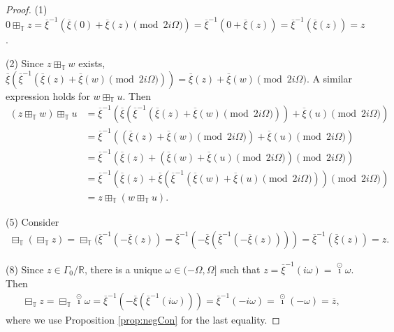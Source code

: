 \documentclass[reqno]{amsart}
\begin{document}
\begin{proof}
(1) $0 \boxplus_{\mathbb{T}} z = \overline{\xi}^{-1}(\overline{\xi}(0) + \overline{\xi}(z) \pmod {2 i \Omega} ) 
= \overline{\xi}^{-1}( 0 + \overline{\xi}(z)) =\overline{\xi}^{-1}( \overline{\xi}(z)) = z$.

(2) Since $z \boxplus_{\mathbb{T}} w$ exists,
$\overline{\xi}(\overline{\xi}^{-1}(\overline{\xi}(z) + \overline{\xi}(w) \pmod{2 i \Omega}))
 = \overline{\xi}(z) + \overline{\xi}(w) \pmod{2 i \Omega}$. A similar expression holds
for $w \boxplus_{\mathbb{T}} u$. Then
\begin{align*}
 (z \boxplus_{\mathbb{T}} w) \boxplus_{\mathbb{T}} u &= \overline{\xi}^{-1} ( \overline{\xi}(\overline{\xi}^{-1}(\overline{\xi}(z) + \overline{\xi}(w) \pmod {2 i \Omega})) + \overline{\xi}(u) \pmod{2 i \Omega}) \\
 & = \overline{\xi}^{-1} ( (\overline{\xi}(z) + \overline{\xi}(w) \pmod{2 i \Omega} ) + \overline{\xi}(u) \pmod{2 i \Omega} ) \\
 & = \overline{\xi}^{-1} ( \overline{\xi}(z) + (\overline{\xi}(w)+ \overline{\xi}(u) \pmod {2 i \Omega}) \pmod {2 i \Omega}) \\
 & = \overline{\xi}^{-1} ( \overline{\xi}(z) + \overline{\xi}(\overline{\xi}^{-1}(\overline{\xi}(w) + \overline{\xi}(u) \pmod {2 i \Omega}))\pmod {2 i \Omega}) \\
 & = z \boxplus_{\mathbb{T}} (w \boxplus_{\mathbb{T}} u).
\end{align*}

(5) Consider
 \begin{align*}
 \boxminus_{\mathbb{T}}(\boxminus_{\mathbb{T}} z) = \boxminus_{\mathbb{T}}(\overline{\xi}^{-1}(-\overline{\xi}(z))
 = \overline{\xi}^{-1}(-\overline{\xi}(\overline{\xi}^{-1}(-\overline{\xi}(z))))
 = \overline{\xi}^{-1}(\overline{\xi}(z))= z.
 \end{align*}

(8) Since $z \in \Gamma_0/\mathbb{R}$, there is a unique $\omega \in (-\Omega,\Omega]$
such that $z = \overline{\xi}^{-1}(i \omega) = \overset{\odot}{\imath} \omega$. Then
 \begin{align*}
 \boxminus_{\mathbb{T}} z = \boxminus_{\mathbb{T}} \overset{\odot}{\imath} \omega
 = \overline{\xi}^{-1}(-\overline{\xi}(\overline{\xi}^{-1}(i \omega)))
 = \overline{\xi}^{-1}(-i \omega)
 = \overset{\odot}{\imath} (-\omega)
 = \overline{z},
 \end{align*}
where we use Proposition \ref{prop:negCon} for the last equality.
\end{proof}
\end{document}
